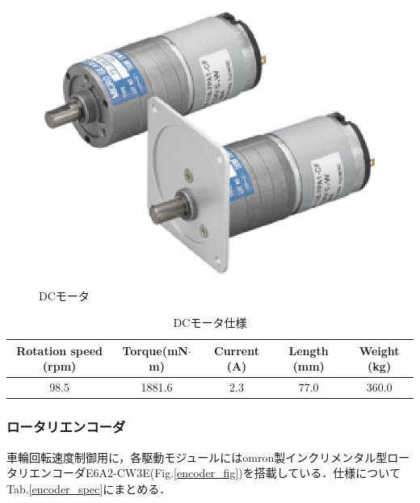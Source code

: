 \begin{figure}[hb]
	\centering
	\includegraphics[clip,scale=0.6]{./figure/te-38f16-24-64.eps}
	\caption{DCモータ}
	\label{dc-motor}
\end{figure}

\begin{table}[hb]
	\centering
	\caption{DCモータ仕様}
	\begin{tabular}{|c|c|c|c|c|} \hline
		Rotation speed (rpm) & Torque(mN$\cdot$m) & Current (A) & Length (mm) & Weight (kg)  \\ \hline \hline
		98.5 & 1881.6 & 2.3 & 77.0 & 360.0 \\ \hline
	\end{tabular}
	\label{motor_spec}
\end{table}
\newpage
\subsubsection{ロータリエンコーダ}
\par 車輪回転速度制御用に，各駆動モジュールにはomron製インクリメンタル型ロータリエンコーダE6A2-CW3E(Fig.\ref{encoder_fig})を搭載している．仕様についてTab.\ref{encoder_spec}にまとめる．

